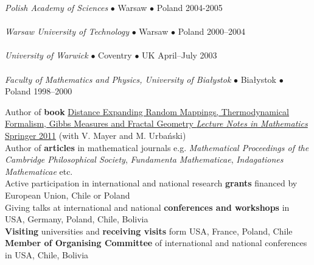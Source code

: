\documentclass[a4paper, twoside]{scrreprt}
\begin{document}
\noindent{}\textit{Polish Academy of Sciences} $\bullet$ 
Warsaw $\bullet$ Poland \hfill 2004-2005\\
\\
\noindent{}\textit{Warsaw University of Technology} $\bullet$  Warsaw $\bullet$ Poland \hfill 2000--2004\\ 
\\
\noindent{}\textit{University of Warwick} 
$\bullet$ Coventry $\bullet$ UK \hfill April–July 2003\\
\\
\noindent{}\textit{Faculty of Mathematics and Physics, University
    of Bia{\l}ystok} $\bullet$  Bia{\l}ystok $\bullet$ Poland \hfill 1998--2000\\ 

\noindent\makebox[\linewidth]{\rule{\textwidth}{0.4pt}}

\vspace{0.1cm}


\noindent\llap{\FA \faBook\ \ }Author of \textbf{book} \href{http://www.amazon.com/Distance-Expanding-Thermodynamical-Formalism-Mathematics/dp/3642236499/ref=sr_1_1?s=books&ie=UTF8&qid=1410309067&sr=1-1}{Distance Expanding Random Mappings, Thermodynamical Formalism, Gibbs Measures and Fractal Geometry \textit{Lecture Notes in Mathematics} Springer 2011} (with V. Mayer and M. Urbański)\\
\noindent\llap{\FA \faPencil\ \ }Author of \textbf{articles} in 
mathematical journals e.g. 
\textit{Mathematical Proceedings of the Cambridge Philosophical Society}, \textit{Fundamenta Mathematicae}, \textit{Indagationes Mathematicae} etc.\\
\noindent\llap{\FA \faBeaker\ \ }Active participation in international and national research \textbf{grants} financed by European Union, Chile or Poland\\
\noindent\llap{\FA \faBullhorn\ \ }Giving talks at international and national \textbf{conferences and workshops} in USA, Germany, Poland, 
Chile, Bolivia\\
\noindent\llap{\FA \faExchange\ \ }\textbf{Visiting} 
universities and \textbf{receiving visits} form USA, France, Poland, Chile\\
\noindent\llap{\FA \faCalendar\ \ }\textbf{Member of Organising Committee} of international and national conferences in USA, Chile, Bolivia
\end{document}
